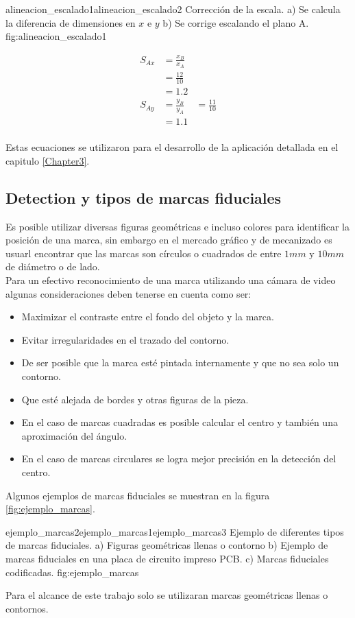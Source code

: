          {alineacion_escalado1}{alineacion_escalado2}
         {Corrección de la escala. a) Se calcula la diferencia de dimensiones en $x$ e $y$ b) Se corrige escalando el plano A.}
         {fig:alineacion_escalado1}

         \begin{equation}
            \begin{aligned}
               S_{Ax} &= \frac{x_B}{x_A}\\
                      &= \frac{12}{10}\\
                      &= 1.2\\
               S_{Ay} &= \frac{y_B}{y_A}
                      &= \frac{11}{10}\\
                      &= 1.1\\
            \end{aligned}
            \label{eq:alineacion_escalado}
         \end{equation}

         Estas ecuaciones se utilizaron para el desarrollo de la aplicación detallada en el capitulo \ref{Chapter3}.

\subsection{Detection y tipos de marcas fiduciales}
   Es posible utilizar diversas figuras geométricas e incluso colores para identificar la posición de una marca, sin embargo en el mercado gráfico y de mecanizado es usuarl encontrar que las marcas son círculos o cuadrados de entre $1mm$ y $10mm$ de diámetro o de lado.\\
   Para un efectivo reconocimiento de una marca utilizando una cámara de video algunas consideraciones deben tenerse en cuenta como ser:
   \begin{itemize}
      \item{Maximizar el contraste entre el fondo del objeto y la marca.}
      \item{Evitar irregularidades en el trazado del contorno.}
      \item{De ser posible que la marca esté pintada internamente y que no sea solo un contorno.}
      \item{Que esté alejada de bordes y otras figuras de la pieza.}
      \item{En el caso de marcas cuadradas es posible calcular el centro y también una aproximación del ángulo.}
      \item{En el caso de marcas circulares se logra mejor precisión en la detección del centro.}
   \end{itemize}
   Algunos ejemplos de marcas fiduciales se muestran en la figura \ref{fig:ejemplo_marcas}.

         {ejemplo_marcas2}{ejemplo_marcas1}{ejemplo_marcas3}
         {Ejemplo de diferentes tipos de marcas fiduciales. a) Figuras geométricas llenas o contorno b) Ejemplo de marcas fiduciales en una placa de circuito impreso PCB. c) Marcas fiduciales codificadas.}
         {fig:ejemplo_marcas}

         Para el alcance de este trabajo solo se utilizaran marcas geométricas llenas o contornos.



